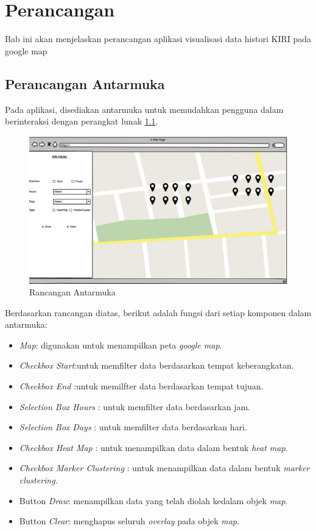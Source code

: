 \chapter{Perancangan}
\label{chap:perancangan}
Bab ini akan menjelaskan perancangan aplikasi visualisasi data histori KIRI pada google map

\section{Perancangan Antarmuka}
\label{sec:perancanganAntarmuka}
Pada aplikasi, disediakan antarmuka untuk memudahkan pengguna dalam berinteraksi dengan perangkat lunak \ref{fig:antarmuka}.

\begin{figure}[H]
	\centering  
	\includegraphics[scale=0.5]{Gambar/mockup.PNG}  
	\caption[Rancangan Antarmuka]{Rancangan Antarmuka} 
	\label{fig:antarmuka} 
\end{figure}

Berdasarkan rancangan diatas, berikut adalah fungsi dari setiap komponen dalam antarmuka:
\begin{itemize}
	\item \textit{Map}: digunakan untuk menampilkan peta \textit{google map}.
	\item \textit{Checkbox Start}:untuk memfilter data berdasarkan tempat keberangkatan.
	\item \textit{Checkbox End} :untuk memilfter data berdasarkan tempat tujuan.
	\item \textit{Selection Box Hours} : untuk memfilter data berdasarkan jam.
	\item \textit{Selection Box Days} : untuk memfilter data berdasarkan hari.
	\item \textit{Checkbox Heat Map} : untuk menampilkan data dalam bentuk \textit{heat map}.
	\item \textit{Checkbox Marker Clustering} : untuk menampilkan data dalam bentuk \textit{marker clustering}.
	\item Button \textit{Draw}: menampilkan data yang telah diolah kedalam objek \textit{map}.
	\item Button \textit{Clear}: menghapus seluruh \textit{overlay} pada objek \textit{map}.
\end{itemize}

